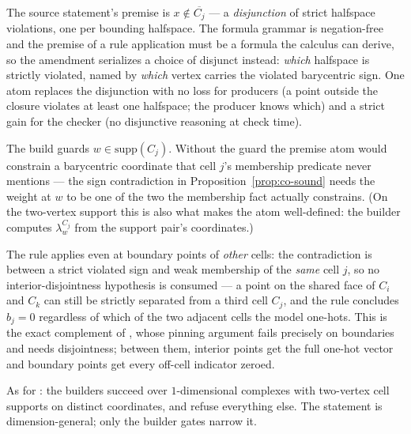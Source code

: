 \begin{bremark}
The source statement's premise is $x \notin \overline{C_j}$ --- a
\emph{disjunction} of strict halfspace violations, one per bounding
halfspace. The formula grammar is negation-free and the premise of a
rule application must be a formula the calculus can derive, so the
amendment serializes a choice of disjunct instead: \emph{which}
halfspace is strictly violated, named by \emph{which} vertex carries
the violated barycentric sign. One atom replaces the disjunction with
no loss for producers (a point outside the closure violates at least
one halfspace; the producer knows which) and a strict gain for the
checker (no disjunctive reasoning at check time).
\end{bremark}

\begin{bremark}
The build guards $w \in \mathrm{supp}(C_j)$. Without the guard the
premise atom would constrain a barycentric coordinate that cell $j$'s
membership predicate never mentions --- the sign contradiction in
Proposition~\ref{prop:co-sound} needs the weight at $w$ to be one of
the two the membership fact actually constrains. (On the two-vertex
support this is also what makes the atom well-defined: the builder
computes $\lambda^{C_j}_w$ from the support pair's coordinates.)
\end{bremark}

\begin{bremark}
The rule applies even at boundary points of \emph{other} cells: the
contradiction is between a strict violated sign and weak membership of
the \emph{same} cell $j$, so no interior-disjointness hypothesis is
consumed --- a point on the shared face of $C_i$ and $C_k$ can still be
strictly separated from a third cell $C_j$, and the rule concludes
$b_j = 0$ regardless of which of the two adjacent cells the model
one-hots. This is the exact complement of ,
whose pinning argument fails precisely on boundaries and needs
disjointness; between them, interior points get the full one-hot vector
and boundary points get every off-cell indicator zeroed.
\end{bremark}

\begin{bremark}
As for : the builders succeed over
$1$-dimensional complexes with two-vertex cell supports on distinct
coordinates, and refuse everything else. The statement is
dimension-general; only the builder gates narrow it.
\end{bremark}

